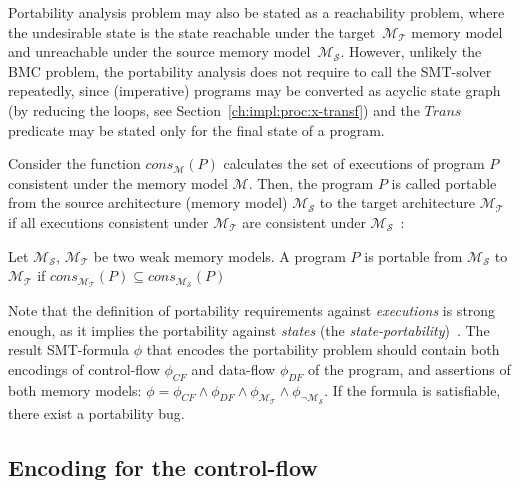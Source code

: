 Portability analysis problem may also be stated as a reachability problem, where the undesirable state is the state reachable under the target~$\mathcal{M_T}$ memory model and unreachable under the source memory model~$\mathcal{M_S}$. However, unlikely the BMC problem, the portability analysis does not require to call the SMT-solver repeatedly, since (imperative) programs may be converted as acyclic state graph (by reducing the loops, see Section~\ref{ch:impl:proc:x-transf}) and the $Trans$ predicate may be stated only for the final state of a program.

Consider the function $cons_{\mathcal{M}}(P)$ calculates the set of executions of program $P$ consistent under the memory model $\mathcal{M}$. Then, the program $P$ is called portable from the source architecture (memory model) $\mathcal{M_S}$ to the target architecture $\mathcal{M_T}$ if all executions consistent under $\mathcal{M_T}$ are consistent under $\mathcal{M_S}$~\cite{Porthos17a}:

\begin{definition}[Portability]
Let $\mathcal{M_S}$, $\mathcal{M_T}$ be two weak memory models. A program $P$ is portable from $\mathcal{M_S}$ to $\mathcal{M_T}$ if 
$cons_{\mathcal{M_T}}(P) \subseteq cons_{\mathcal{M_S}}(P)$
\end{definition}

Note that the definition of portability requirements against \textit{executions} is strong enough, as it implies the portability against \textit{states} (the \textit{state-portability})~\cite{Porthos17b}.
The result SMT-formula $\phi$ that encodes the portability problem should contain both encodings of control-flow $\phi_{CF}$ and data-flow $\phi_{DF}$ of the program, and assertions of both memory models: ${\phi = \phi_{CF} \land \phi_{DF} \land \phi_{\mathcal{M_T}} \land \phi_{\lnot\mathcal{M_S}}}$. If the formula is satisfiable, there exist a portability bug.


\subsection{Encoding for the control-flow} %
\label{ch:port:enc:cf}

